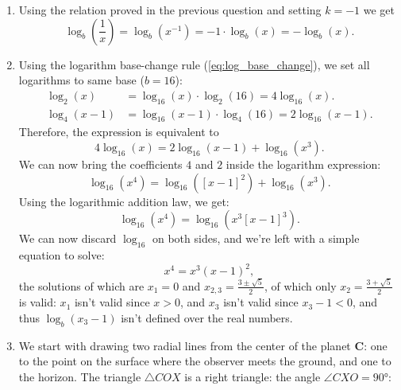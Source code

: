 \begin{enumerate}
	\item Using the relation proved in the previous question and setting $k=-1$ we get
		\[
			\log_{b} \left( \frac{1}{x} \right) = \log_{b} \left( x^{-1} \right) = -1\cdot\log_{b}(x) = -\log_{b}(x).
		\]

	\item Using the logarithm base-change rule (\autoref{eq:log_base_change}), we set all logarithms to same base ($b=16$):
		\begin{align*}
			\log_{2}(x) &= \log_{16}(x)\cdot\log_{2}(16) = 4\log_{16}(x).\\
			\log_{4}(x-1) &= \log_{16}(x-1)\cdot\log_{4}(16) = 2\log_{16}(x-1).
		\end{align*}
		Therefore, the expression is equivalent to
		\[
			4\log_{16}(x) = 2\log_{16}(x-1) + \log_{16}(x^{3}).
		\]
		We can now bring the coefficients $4$ and $2$ inside the logarithm expression:
		\[
			\log_{16}(x^{4}) = \log_{16}(\left[x-1\right]^{2}) + \log_{16}\left(x^{3}\right).
		\]
		Using the logarithmic addition law, we get:
		\[
			\log_{16}(x^{4}) = \log_{16}(x^{3}\left[x-1\right]^{3}).
		\]
		We can now discard $\log_{16}$ on both sides, and we're left with a simple equation to solve:
		\[
			x^{4} = x^{3} \left( x-1 \right)^{2},
		\]
		the solutions of which are $x_{1}=0$ and $x_{2,3}=\frac{3\pm\sqrt{5}}{2}$, of which only $x_{2} = \frac{3+\sqrt{5}}{2}$ is valid: $x_{1}$ isn't valid since $x>0$, and $x_{3}$ isn't valid since $x_{3}-1<0$, and thus $\log_{b}\left(x_{3}-1\right)$ isn't defined over the real numbers.

	\item We start with drawing two radial lines from the center of the planet $\bm{C}$: one to the point on the surface where the observer meets the ground, and one to the horizon. The triangle $\triangle COX$ is a right triangle: the angle $\angle CXO=\ang{90}$:
		
		\begin{center}
		\end{center}


\end{enumerate}
